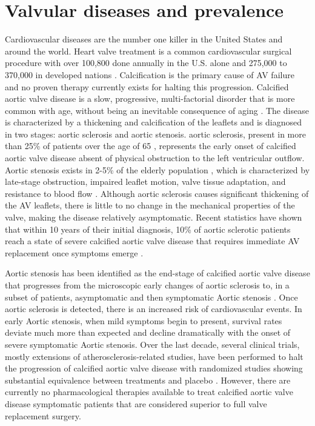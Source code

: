 \section{Valvular diseases and prevalence}

    Cardiovascular diseases are the number one killer in the United States and around the world. Heart valve treatment is a common cardiovascular surgical procedure with over 100,800 done annually in the U.S. alone \cite{mozaffarian_heart_2015} and 275,000 to 370,000 in developed nations \cite{manji_future_2012}. Calcification is the primary cause of AV failure and no proven therapy currently exists for halting this progression. Calcified aortic valve disease is a slow, progressive, multi-factorial disorder that is more common with age, without being an inevitable consequence of aging \cite{towler_molecular_2013,freeman_management_2002,freeman_spectrum_2005,kurtz_aortic_2010,beckmann_insights_2010}. The disease is characterized by a thickening and calcification of the leaflets and is diagnosed in two stages: aortic sclerosis and aortic stenosis. aortic sclerosis, present in more than 25\% of patients over the age of 65 \cite{obrien_pathogenesis_2006}, represents the early onset of calcified aortic valve disease absent of physical obstruction to the left ventricular outflow. Aortic stenosis exists in 2-5\% of the elderly population \cite{obrien_pathogenesis_2006}, which is characterized by late-stage obstruction, impaired leaflet motion, valve tissue adaptation, and resistance to blood flow \cite{poggio_noggin_2013,grau_analysis_2012,gharacholou_aortic_2011,pflederer_aortic_2010}. Although aortic sclerosis causes significant thickening of the AV leaflets, there is little to no change in the mechanical properties of the valve, making the disease relatively asymptomatic. Recent statistics have shown that within 10 years of their initial diagnosis, 10\% of aortic sclerotic patients reach a state of severe calcified aortic valve disease that requires immediate AV replacement once symptoms emerge \cite{gharacholou_aortic_2011}. 
    
    
    Aortic stenosis has been identified as the end-stage of calcified aortic valve disease that progresses from the microscopic early changes of aortic sclerosis to, in a subset of patients, asymptomatic and then symptomatic Aortic stenosis \cite{kurtz_aortic_2010,otto_calcific_2010,aikawa_look_2011}. Once aortic sclerosis is detected, there is an increased risk of cardiovascular events. In early Aortic stenosis, when mild symptoms begin to present, survival rates deviate much more than expected and decline dramatically with the onset of severe symptomatic Aortic stenosis. Over the last decade, several clinical trials, mostly extensions of atherosclerosis-related studies, have been performed to halt the progression of calcified aortic valve disease with randomized studies showing substantial equivalence between treatments and placebo \cite{parolari_do_2011,moura_rosuvastatin_2007,cowell_randomized_2005,benton_statins_2009,rossebo_intensive_2008}. However, there are currently no pharmacological therapies available to treat calcified aortic valve disease symptomatic patients that are considered superior to full valve replacement surgery. 


